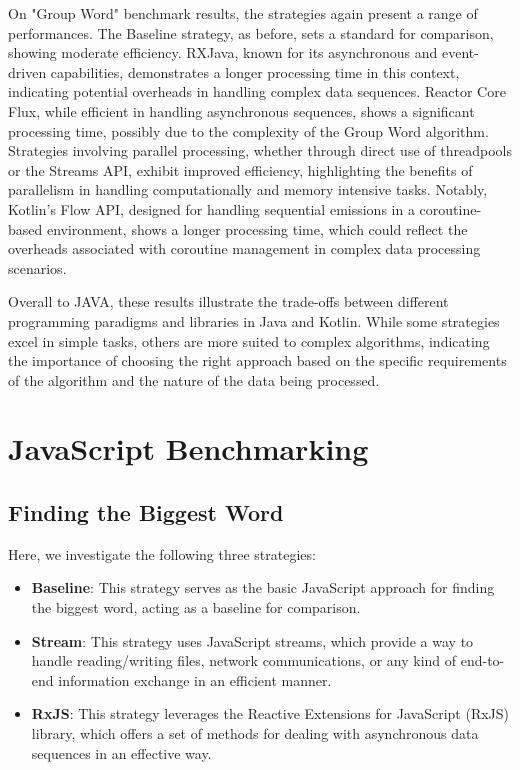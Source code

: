     \clearpage
    
    On "Group Word" benchmark results, the strategies again present a range of performances. The Baseline strategy, as before, sets a standard for comparison, showing moderate efficiency. RXJava, known for its asynchronous and event-driven capabilities, demonstrates a longer processing time in this context, indicating potential overheads in handling complex data sequences. Reactor Core Flux, while efficient in handling asynchronous sequences, shows a significant processing time, possibly due to the complexity of the Group Word algorithm. Strategies involving parallel processing, whether through direct use of threadpools or the Streams API, exhibit improved efficiency, highlighting the benefits of parallelism in handling computationally and memory intensive tasks. Notably, Kotlin's Flow API, designed for handling sequential emissions in a coroutine-based environment, shows a longer processing time, which could reflect the overheads associated with coroutine management in complex data processing scenarios.


    Overall to JAVA, these results illustrate the trade-offs between different programming paradigms and libraries in Java and Kotlin. While some strategies excel in simple tasks, others are more suited to complex algorithms, indicating the importance of choosing the right approach based on the specific requirements of the algorithm and the nature of the data being processed.


\section{JavaScript Benchmarking}
\label{sec:js_implementation}


\subsection{Finding the Biggest Word}
\label{subsec:biggest_word_js}

Here, we investigate the following three strategies:

\begin{itemize}
    \item \textbf{Baseline}: This strategy serves as the basic JavaScript approach for finding the biggest word, acting as a baseline for comparison.
    \item \textbf{Stream}: This strategy uses JavaScript streams, which provide a way to handle reading/writing files, network communications, or any kind of end-to-end information exchange in an efficient manner.
    \item \textbf{RxJS}: This strategy leverages the Reactive Extensions for JavaScript (RxJS) library, which offers a set of methods for dealing with asynchronous data sequences in an effective way.
\end{itemize}


